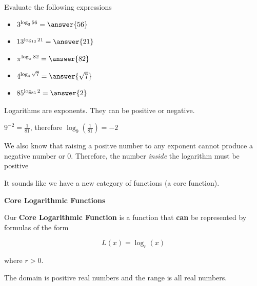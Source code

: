 \documentclass{ximera}
\begin{document}
\begin{example}
Evaluate the following expressions

\begin{itemize}
\item  $3^{\log_3{56}} = \answer{56}$
\item  $13^{\log_{13}{21}} = \answer{21}$
\item  $\pi^{\log_{\pi}{82}} = \answer{82}$
\item  $4^{\log_4{\sqrt{7}}} = \answer{\sqrt{7}}$
\item  $85^{\log_{85}{2}} = \answer{2}$

\end{itemize}

\end{example}












Logarithms are exponents.  They can be positive or negative.



$9^{-2} = \frac{1}{81}$, therefore  $\log_{9}\left(\frac{1}{81}\right) = -2$



We also know that raising a positve number to any exponent cannot produce a negative number or $0$.  Therefore, the number \textit{inside} the logarithm must be positive



It sounds like we have a new category of functions (a core function).




\begin{idea} \textbf{\textcolor{blue!55!black}{Core Logarithmic Functions}}

Our \textbf{Core Logarithmic Function} is a function that \textbf{\textcolor{purple!85!blue}{can}} be represented by formulas of the form

\[     L(x) =    \log_r(x)            \]

where $r > 0$.

The domain is positive real numbers and the range is all real numbers.

\end{idea}
\end{document}
